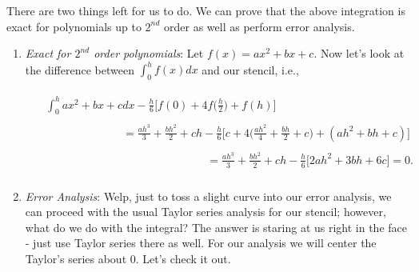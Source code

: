 \documentclass[paper=a4, fontsize=11pt]{scrartcl} %
\numberwithin{equation}{section} %
\numberwithin{figure}{section} %
\numberwithin{table}{section} %
\begin{document}
There are two things left for us to do. We can prove that the above integration is exact for polynomials up to $2^{nd}$ order as well as perform error analysis. \\

\begin{enumerate}
\item \emph{Exact for $2^{nd}$ order polynomials}:  Let $f(x) = ax^2 + bx + c$. Now let's look at the difference between $\int_0^h f(x) dx$ and our stencil, i.e.,

\begin{align}
\nonumber
\begin{split}
&\ \int_0^h ax^2+bx+c dx -  \frac{h}{6} \Bigg[ f(0) + 4 f\bigg(\frac{h}{2} \bigg) + f(h) \Bigg] \\ \\
& \ \ \ \ \  \ \ \ \ \ \ \ \ \ \ \  \ \ \ \ \ \ \ \ \ \ \ \ \ \ \ \ = \frac{ah^3}{3}+\frac{bh^2}{2}+ch -  \frac{h}{6} \Bigg[ c + 4\bigg( \frac{ah^2}{4}+\frac{bh}{2}+c \bigg) + (ah^2+bh+c) \Bigg] \\ \\
& \ \ \ \ \  \ \ \ \ \ \ \ \ \ \ \  \ \ \ \ \ \ \ \ \ \ \ \ \ \ \ \  \ \ \ \ \ \ \ \ \ \ \ \ \ \ \ \ \ \  \ \ \ \ \ \ \ \ \ \ \ \ \ \ \ \ =  \frac{ah^3}{3}+\frac{bh^2}{2}+ch  - \frac{h}{6} \Big[ 2ah^2+3bh+ 6c\Big] = 0.\\
\end{split}
\end{align}

\item \emph{Error Analysis}:  Welp, just to toss a slight curve into our error analysis, we can proceed with the usual Taylor series analysis for our stencil; however, what do we do with the integral? The answer is staring at us right in the face - just use Taylor series there as well. For our analysis we will center the Taylor's series about 0. Let's check it out.\\


\end{enumerate}
\end{document}
